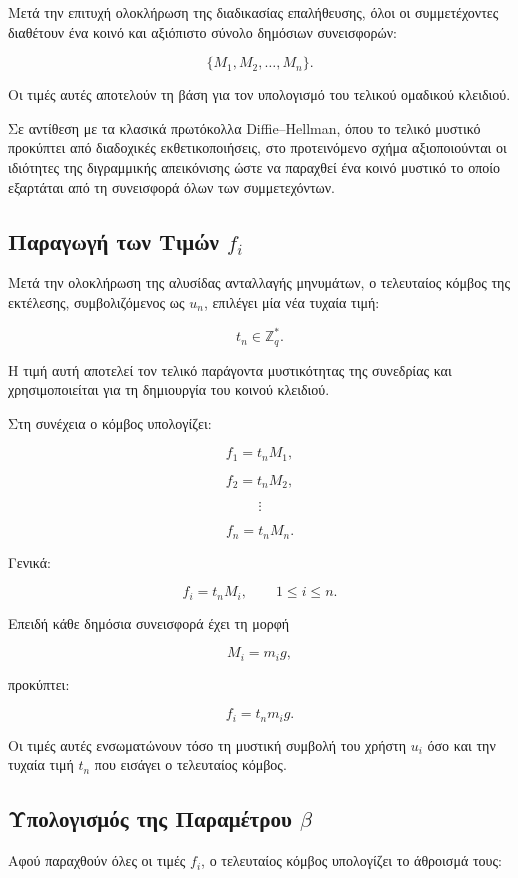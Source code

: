 \documentclass[12pt,a4paper]{report}
\begin{document}
Μετά την επιτυχή ολοκλήρωση της διαδικασίας επαλήθευσης, όλοι οι συμμετέχοντες διαθέτουν ένα κοινό και αξιόπιστο σύνολο δημόσιων συνεισφορών:

\[
\{M_1,M_2,\ldots,M_n\}.
\]

Οι τιμές αυτές αποτελούν τη βάση για τον υπολογισμό του τελικού ομαδικού κλειδιού.

Σε αντίθεση με τα κλασικά πρωτόκολλα Diffie--Hellman, όπου το τελικό μυστικό προκύπτει από διαδοχικές εκθετικοποιήσεις, στο προτεινόμενο σχήμα αξιοποιούνται οι ιδιότητες της διγραμμικής απεικόνισης ώστε να παραχθεί ένα κοινό μυστικό το οποίο εξαρτάται από τη συνεισφορά όλων των συμμετεχόντων.

\subsection{Παραγωγή των Τιμών \(f_i\)}

Μετά την ολοκλήρωση της αλυσίδας ανταλλαγής μηνυμάτων, ο τελευταίος κόμβος της εκτέλεσης, συμβολιζόμενος ως \(u_n\), επιλέγει μία νέα τυχαία τιμή:

\[
t_n \in \mathbb{Z}_q^{*}.
\]

Η τιμή αυτή αποτελεί τον τελικό παράγοντα μυστικότητας της συνεδρίας και χρησιμοποιείται για τη δημιουργία του κοινού κλειδιού.

Στη συνέχεια ο κόμβος υπολογίζει:

\[
f_1=t_nM_1,
\]

\[
f_2=t_nM_2,
\]

\[
\vdots
\]

\[
f_n=t_nM_n.
\]

Γενικά:

\[
f_i=t_nM_i,
\qquad
1 \leq i \leq n.
\]

Επειδή κάθε δημόσια συνεισφορά έχει τη μορφή

\[
M_i=m_i g,
\]

προκύπτει:

\[
f_i=t_nm_i g.
\]

Οι τιμές αυτές ενσωματώνουν τόσο τη μυστική συμβολή του χρήστη \(u_i\) όσο και την τυχαία τιμή \(t_n\) που εισάγει ο τελευταίος κόμβος.

\subsection{Υπολογισμός της Παραμέτρου \(\beta\)}

Αφού παραχθούν όλες οι τιμές \(f_i\), ο τελευταίος κόμβος υπολογίζει το άθροισμά τους:
\end{document}
